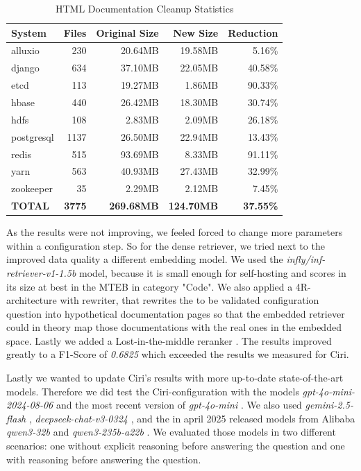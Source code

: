 \begin{table}[h]
    \centering
    \begin{tabular}{|l|r|r|r|r|}
        \hline
        \textbf{System} & \textbf{Files} & \textbf{Original Size} & \textbf{New Size} & \textbf{Reduction} \\
        \hline
        alluxio & 230 & 20.64MB & 19.58MB & 5.16\% \\
        django & 634 & 37.10MB & 22.05MB & 40.58\% \\
        etcd & 113 & 19.27MB & 1.86MB & 90.33\% \\
        hbase & 440 & 26.42MB & 18.30MB & 30.74\% \\
        hdfs & 108 & 2.83MB & 2.09MB & 26.18\% \\
        postgresql & 1137 & 26.50MB & 22.94MB & 13.43\% \\
        redis & 515 & 93.69MB & 8.33MB & 91.11\% \\
        yarn & 563 & 40.93MB & 27.43MB & 32.99\% \\
        zookeeper & 35 & 2.29MB & 2.12MB & 7.45\% \\
        \hline
        \textbf{TOTAL} & \textbf{3775} & \textbf{269.68MB} & \textbf{124.70MB} & \textbf{37.55\%} \\
        \hline
    \end{tabular}
    \caption{HTML Documentation Cleanup Statistics}
    \label{tab:cleanup_stats}
\end{table}

As the results were not improving, we feeled forced to change more parameters within a configuration step. So for the dense retriever, we tried next to the improved data quality a different embedding model. We used the \textit{infly/inf-retriever-v1-1.5b} \cite{inflyai2025} model, because it is small enough for self-hosting and scores in its size at best in the MTEB \cite{muennighoff2022mteb} \cite{MTEB} in category "Code". We also applied a 4R-architecture with rewriter, that rewrites the to be validated configuration question into hypothetical documentation pages so that the embedded retriever could in theory map those documentations with the real ones in the embedded space. Lastly we added a Lost-in-the-middle reranker \cite{Liu.06.07.2023}. The results improved greatly to a F1-Score of \textit{0.6825} which exceeded the results we measured for Ciri. 


Lastly we wanted to update Ciri's results with more up-to-date state-of-the-art models. Therefore we did test the Ciri-configuration with the models \textit{gpt-4o-mini-2024-08-06} and the most recent version of \textit{gpt-4o-mini} \cite{OpenAI_2022}. We also used \textit{gemini-2.5-flash} \cite{gemini-2.0}, \textit{deepseek-chat-v3-0324} \cite{deepseekai2024deepseekv3technicalreport}, and the in april 2025 released models from Alibaba \textit{qwen3-32b} and \textit{qwen3-235b-a22b} \cite{qwen3}. We evaluated those models in two different scenarios: one without explicit reasoning before answering the question and one with reasoning before answering the question. 

